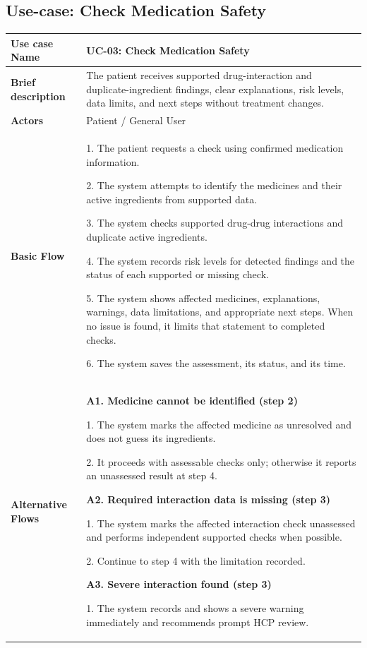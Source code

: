 \subsection{Use-case: Check Medication Safety}
\label{uc:uc-03}
\begin{longtable}{|p{}|p{}|}
\hline
\textbf{Use case Name} & UC-03: Check Medication Safety \\ \hline
\textbf{Brief description} & The patient receives supported drug-interaction and duplicate-ingredient findings, clear explanations, risk levels, data limits, and next steps without treatment changes. \\ \hline
\textbf{Actors} & Patient / General User \\ \hline
\textbf{Basic Flow} &
1. The patient requests a check using confirmed medication information.\par
2. The system attempts to identify the medicines and their active ingredients from supported data.\par
3. The system checks supported drug-drug interactions and duplicate active ingredients.\par
4. The system records risk levels for detected findings and the status of each supported or missing check.\par
5. The system shows affected medicines, explanations, warnings, data limitations, and appropriate next steps. When no issue is found, it limits that statement to completed checks.\par
6. The system saves the assessment, its status, and its time.
\\ \hline
\textbf{Alternative Flows} &
\textbf{A1. Medicine cannot be identified (step 2)}\par
1. The system marks the affected medicine as unresolved and does not guess its ingredients.\par
2. It proceeds with assessable checks only; otherwise it reports an unassessed result at step 4.
\par\smallskip
\textbf{A2. Required interaction data is missing (step 3)}\par
1. The system marks the affected interaction check unassessed and performs independent supported checks when possible.\par
2. Continue to step 4 with the limitation recorded.
\par\smallskip
\textbf{A3. Severe interaction found (step 3)}\par
1. The system records and shows a severe warning immediately and recommends prompt HCP review.\par

\end{longtable}
